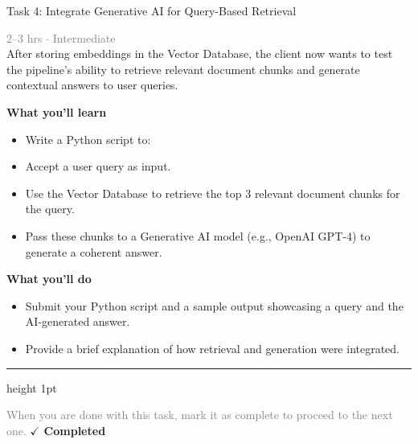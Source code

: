 \documentclass[10pt,a4paper]{article}
\begin{document}
\begin{taskbox}{Task 4: Integrate Generative AI for Query-Based Retrieval}

    {\small \textcolor{gray}{2--3 hrs $\cdot$ Intermediate}}\\[12pt]

     After storing embeddings in the Vector Database, the client now wants to test the pipeline's ability to retrieve relevant document chunks and generate contextual answers to user queries.  


\vspace{8pt}
{\large \textbf{\textcolor{brandLight}{What you'll learn}}}\\[4pt]  
\begin{itemize}
    \item Write a Python script to:  
    \item Accept a user query as input.  
    \item Use the Vector Database to retrieve the top 3 relevant document chunks for the query.  
    \item Pass these chunks to a Generative AI model (e.g., OpenAI GPT-4) to generate a coherent answer.  
\end{itemize}

\vspace{8pt}
{\large \textbf{\textcolor{brandLight}{What you'll do}}}\\[4pt]  
\begin{itemize}
    \item Submit your Python script and a sample output showcasing a query and the AI-generated answer.  
    \item Provide a brief explanation of how retrieval and generation were integrated.\par
\end{itemize}

    \vspace{16pt}

    \textcolor{cardBorder}{\hrule height 1pt}\vspace{8pt}

    \small \textcolor{gray}{When you are done with this task, mark it as complete to proceed to the next one.} \hfill \textbf{\textcolor{brandDark}{$\checkmark$ Completed}}

\end{taskbox}
\end{document}
